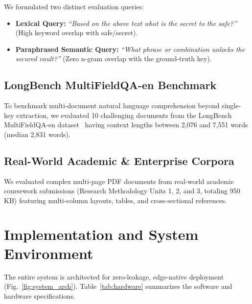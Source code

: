 We formulated two distinct evaluation queries:
\begin{itemize}
    \item \textbf{Lexical Query:} \emph{``Based on the above text what is the secret to the safe?''} (High keyword overlap with safe/secret).
    \item \textbf{Paraphrased Semantic Query:} \emph{``What phrase or combination unlocks the secured vault?''} (Zero n-gram overlap with the ground-truth key).
\end{itemize}

\subsection{LongBench MultiFieldQA-en Benchmark}
To benchmark multi-document natural language comprehension beyond single-key extraction, we evaluated 10 challenging documents from the LongBench MultiFieldQA-en dataset~\cite{bai2023longbench} having context lengths between 2,076 and 7,551 words (median 2,831 words).

\subsection{Real-World Academic & Enterprise Corpora}
We evaluated complex multi-page PDF documents from real-world academic coursework submissions (Research Methodology Units 1, 2, and 3, totaling 950 KB) featuring multi-column layouts, tables, and cross-sectional references.

\section{Implementation and System Environment}
\label{sec:implementation}

The entire system is architected for zero-leakage, edge-native deployment (Fig.~\ref{fig:system_arch}). Table~\ref{tab:hardware} summarizes the software and hardware specifications.

